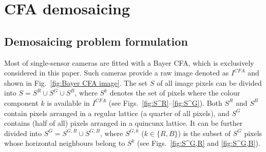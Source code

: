 \documentclass[twoside]{article}
\begin{document}


\section{CFA demosaicing}
\label{sec:CFA_demosaicing}

\subsection{Demosaicing problem formulation}
\label{subsec:problem_formulation}

Most of single-sensor cameras are fitted with a Bayer CFA, which is exclusively considered in this paper. Such cameras provide a raw image denoted as $I^{CFA}$ and shown in Fig.~\ref{fig:Bayer CFA image}. The set $S$ of all image pixels can be divided into $S = S^R \cup S^G \cup S^B$, where $S^k$ denotes the set of pixels where the colour component $k$ is available in $I^{CFA}$ (see Figs.~\ref{fig:S^R}--\ref{fig:S^G}). Both $S^R$ and $S^B$ contain pixels arranged in a regular lattice (a quarter of all pixels), and $S^G$ contains (half of all) pixels arranged in a quincunx lattice. It can be further divided into $S^G = S^{G,R} \cup S^{G,B}$, where $S^{G,k}$ ($k \in \{R,B\}$) is the subset of $S^G$ pixels whose horizontal neighbours belong to $S^k$ (see Figs.~\ref{fig:S^G,R} and \ref{fig:S^G,B}).
\end{document}
